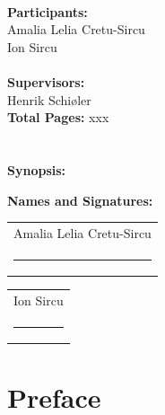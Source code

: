 \documentclass[a4paper, 11pt, twoside]{report}
\begin{document}
\begin{multicols*}{2}
	\\\textbf{Participants:}
	\\Amalia Lelia Cretu-Sircu \\Ion Sircu \\
	\\\textbf{Supervisors:} \\Henrik Schiøler  \vspace{0.5cm}
	\\\textbf{Total Pages:} xxx \vspace{0.3cm}
	\\\vspace{1.8cm}
	\\
	\vspace{0.7cm}
	\\\color{black}\textbf{Synopsis:}
	\begin{framed}
    
	\end{framed}
	\end{multicols*}
	
\noindent \textbf{Names and Signatures:} \vspace{0.5cm} 
\maketitle
\newcommand{\namesigdate}[2][5cm]{%
  \begin{tabular}{@{}p{#1}@{}}
    #2 \\[1.5\normalbaselineskip] \hrule \\[10pt]
  \end{tabular}
}

\noindent \namesigdate{Amalia Lelia Cretu-Sircu} \hfill \namesigdate{Ion Sircu}




\maketitle
\newpage
\titlespacing*{\chapter}{0pt}{-50pt}{40pt}
\chapter*{Preface}

\setcounter{tocdepth}{2}
\setcounter{secnumdepth}{2}
\tableofcontents
{}
\end{document}

